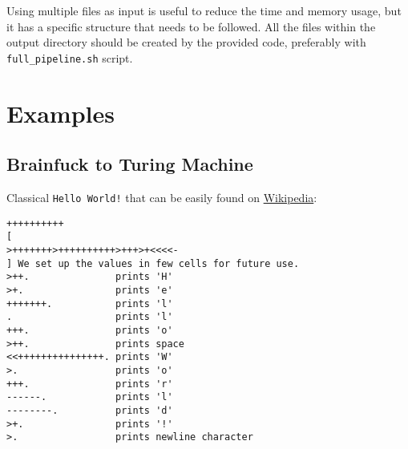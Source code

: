 \documentclass[english,shortabstract,mgr]{iithesis}
\begin{document}
Using multiple files as input is useful to reduce the time and memory
usage, but it has a specific structure that needs to be followed. All the files
within the output directory should be created by the provided code, preferably
with \texttt{full\_pipeline.sh} script.

\section{Examples}

\subsection{Brainfuck to Turing Machine}

Classical \texttt{Hello World!} that can be easily found on \href{https://pl.wikipedia.org/wiki/Brainfuck#Przyk%C5%82ady}{Wikipedia}:

\begin{verbatim}
++++++++++
[
>+++++++>++++++++++>+++>+<<<<-
] We set up the values in few cells for future use.
>++.               prints 'H'
>+.                prints 'e'
+++++++.           prints 'l'
.                  prints 'l'
+++.               prints 'o'
>++.               prints space
<<+++++++++++++++. prints 'W'
>.                 prints 'o'
+++.               prints 'r'
------.            prints 'l'
--------.          prints 'd'
>+.                prints '!'
>.                 prints newline character
\end{verbatim}
\end{document}

